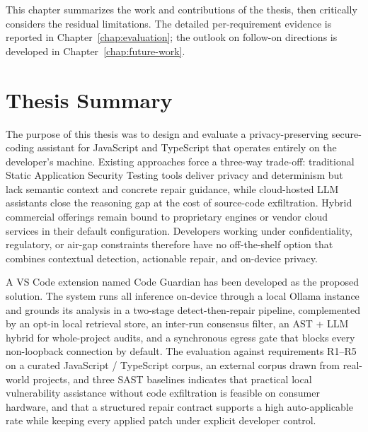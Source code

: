 This chapter summarizes the work and contributions of the thesis, then critically considers the residual limitations. The detailed per-requirement evidence is reported in Chapter~\ref{chap:evaluation}; the outlook on follow-on directions is developed in Chapter~\ref{chap:future-work}.


\section{Thesis Summary}

The purpose of this thesis was to design and evaluate a privacy-preserving secure-coding assistant for JavaScript and TypeScript that operates entirely on the developer's machine. Existing approaches force a three-way trade-off: traditional Static Application Security Testing tools deliver privacy and determinism but lack semantic context and concrete repair guidance, while cloud-hosted LLM assistants close the reasoning gap at the cost of source-code exfiltration. Hybrid commercial offerings remain bound to proprietary engines or vendor cloud services in their default configuration. Developers working under confidentiality, regulatory, or air-gap constraints therefore have no off-the-shelf option that combines contextual detection, actionable repair, and on-device privacy.

A VS Code extension named Code Guardian has been developed as the proposed solution. The system runs all inference on-device through a local Ollama instance and grounds its analysis in a two-stage detect-then-repair pipeline, complemented by an opt-in local retrieval store, an inter-run consensus filter, an AST + LLM hybrid for whole-project audits, and a synchronous egress gate that blocks every non-loopback connection by default. The evaluation against requirements R1--R5 on a curated JavaScript / TypeScript corpus, an external corpus drawn from real-world projects, and three SAST baselines indicates that practical local vulnerability assistance without code exfiltration is feasible on consumer hardware, and that a structured repair contract supports a high auto-applicable rate while keeping every applied patch under explicit developer control.

